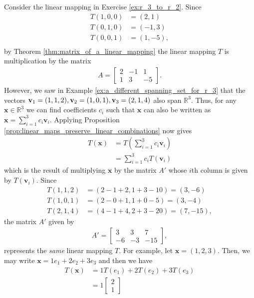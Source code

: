 \documentclass[12pt,letterpaper,reqno]{article}
\numberwithin{equation}{section}
\begin{document}
\begin{example}
	Consider the linear mapping in Exercise \ref{ex:r_3_to_r_2}. Since 
	\begin{align*}
		T(1,0,0)&=(2,1) \\
		T(0,1,0)&=(-1,3) \\
		T(0,0,1)&=(1,-5), \\
	\end{align*}
	by Theorem \ref{thm:matrix_of_a_linear_mapping} the linear mapping $T$ is multiplication by the matrix
	\begin{align*}
		A=\begin{bmatrix}
			2 & -1 & 1 \\
			1 & 3 & -5
		\end{bmatrix}.
	\end{align*}
	However, we saw in Example \ref{ex:a_different_spanning_set_for_r_3} that the vectors ${\bf v}_1=(1,1,2), {\bf v}_2=(1,0,1), {\bf v}_3=(2,1,4)$ also span $\mathbb{R}^3$. Thus, for any $\mathbf{x} \in \mathbb{R}^3$ we can find coefficients $c_i$ such that $\mathbf{x}$ can also be written as $\mathbf{x}=\sum_{i=1}^3c_i\mathbf{v}_i$. Applying Proposition \ref{prop:linear_maps_preserve_linear_combinations} now gives
	\begin{align*}
		T(\mathbf{x})&=T(\sum_{i=1}^3c_i\mathbf{v}_i) \\
		&=\sum_{i=1}^3c_iT(\mathbf{v}_i)
	\end{align*}
	which is the result of multiplying $\mathbf{x}$ by the matrix $A'$ whose $i$th column is given by $T(\mathbf{v}_i)$. Since
	\begin{align*}
		T(1,1,2)&=(2-1+2, 1+3-10)=(3, -6) \\
		T(1,0,1)&=(2-0+1, 1+0-5)=(3,-4) \\
		T(2,1,4)&=(4-1+4,2+3-20)=(7,-15),
	\end{align*}
	the matrix $A'$ given by
	\begin{align*}
		A'=\begin{bmatrix}
			3 & 3 & 7 \\
			-6 & -3 & -15
		\end{bmatrix},
	\end{align*}
	represents the \emph{same} linear mapping $T$. For example, let $\mathbf{x}=(1,2,3)$. Then, we may write $\mathbf{x}=1e_1+2e_2+3e_3$ and then we have 
	\begin{align*}
		T(\mathbf{x})&=1T(e_1)+2T(e_2)+3T(e_3) \\
		&=1\begin{bmatrix}
			2 \\ 1

\end{bmatrix}
\end{align*}
\end{example}
\end{document}

